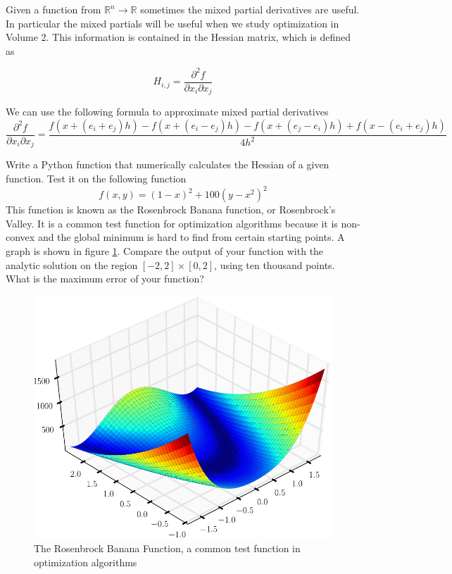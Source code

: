 Given a function from $\mathbb{R}^n \to \mathbb{R}$ sometimes the mixed partial derivatives are useful. In particular the mixed partials will be useful when we study optimization in Volume 2. This information is contained in the Hessian matrix, which is defined as

\begin{equation*}
H_{i,j} = \frac{\partial^2 f}{\partial x_i \partial x_j}
\end{equation*}

We can use the following formula to approximate mixed partial derivatives
\small
\begin{equation*}
\frac{\partial^2 f}{\partial x_i \partial x_j} = \frac{f(x + (e_i + e_j)h) - f(x + (e_i-e_j)h) -f(x + (e_j-e_i)h) + f(x - (e_i + e_j)h)}{4h^2}
\end{equation*}
\normalsize

\begin{problem}
Write a Python function that numerically calculates the Hessian of a given function. Test it on the following function
\begin{equation*}
f(x,y) = (1-x)^2 + 100(y-x^2)^2
\end{equation*}
This function is known as the Rosenbrock Banana function, or Rosenbrock's Valley. It is a common test function for optimization algorithms because it is non-convex and the global minimum is hard to find from certain starting points. A graph is shown in figure \ref{Fig:Rosenbrock}. Compare the output of your function with the analytic solution on the region $[-2,2] \times [0,2]$, using ten thousand points. What is the maximum error of your function?
\end{problem}
\begin{figure}
\begin{center}
\includegraphics[width = \textwidth]{Rosenbrock}
\caption{The Rosenbrock Banana Function, a common test function in optimization algorithms}
\label{Fig:Rosenbrock}
\end{center}
\end{figure}
